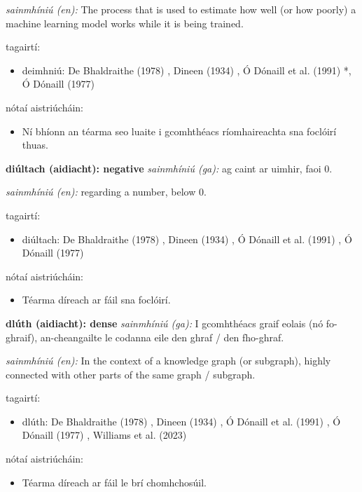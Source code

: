 \documentclass{article}
\begin{document}
\textit{sainmhíniú (en):} The process that is used to estimate how well (or how poorly) a machine learning model works while it is being trained.

tagairtí:
\begin{itemize}
	\item deimhniú: De Bhaldraithe (1978) \cite{de-bhaldraithe}, Dineen (1934) \cite{dineen}, Ó Dónaill et al. (1991) \cite{focloir-beag}*, Ó Dónaill (1977) \cite{odonaill}
\end{itemize}

nótaí aistriúcháin:
\begin{itemize}
	\item Ní bhíonn an téarma seo luaite i gcomhthéacs ríomhaireachta sna foclóirí thuas.
\end{itemize}


\textbf{diúltach (aidiacht): negative}
\textit{sainmhíniú (ga):} ag caint ar uimhir, faoi 0.

\textit{sainmhíniú (en):} regarding a number, below 0.

tagairtí:
\begin{itemize}
	\item diúltach: De Bhaldraithe (1978) \cite{de-bhaldraithe}, Dineen (1934) \cite{dineen}, Ó Dónaill et al. (1991) \cite{focloir-beag}, Ó Dónaill (1977) \cite{odonaill}
\end{itemize}

nótaí aistriúcháin:
\begin{itemize}
	\item Téarma díreach ar fáil sna foclóirí.
\end{itemize}


\textbf{dlúth (aidiacht): dense}
\textit{sainmhíniú (ga):} I gcomhthéacs graif eolais (nó fo-ghraif), an-cheangailte le codanna eile den ghraf / den fho-ghraf.

\textit{sainmhíniú (en):} In the context of a knowledge graph (or subgraph), highly connected with other parts of the same graph / subgraph.

tagairtí:
\begin{itemize}
	\item dlúth: De Bhaldraithe (1978) \cite{de-bhaldraithe}, Dineen (1934) \cite{dineen}, Ó Dónaill et al. (1991) \cite{focloir-beag}, Ó Dónaill (1977) \cite{odonaill}, Williams et al. (2023) \cite{storchiste}
\end{itemize}

nótaí aistriúcháin:
\begin{itemize}
	\item Téarma díreach ar fáil le brí chomhchosúil.
\end{itemize}
\end{document}
